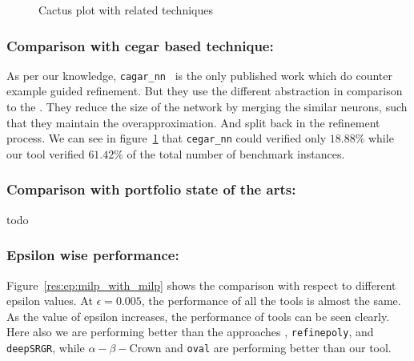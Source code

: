 


\begin{figure}
    \centering
    
    \caption{Cactus plot with related techniques}
    \label{res:milp_with_milp}
\end{figure}

\subsubsection{Comparison with cegar based technique: }
As per our knowledge, \texttt{cagar\_nn}~\cite{elboher2020abstraction} is the only published work which do 
counter example guided refinement. But they use the different abstraction in comparison to the 
\deeppoly{}. They reduce the size of the network by merging the similar neurons, such that 
they maintain the overapproximation. And split back in the refinement process. 
We can see in figure~\ref{res:milp_with_milp} that \texttt{cegar\_nn} could verified only 
$18.88\%$ while our tool verified $61.42\%$ of the total number of benchmark instances. 

\subsubsection{Comparison with portfolio state of the arts: }
todo

\subsubsection{Epsilon wise performance: }
Figure~\ref{res:ep:milp_with_milp} shows the comparison with respect to different epsilon values. 
At $\epsilon=0.005$, the performance of all the tools is almost the same. As the value of epsilon increases, the 
performance of tools can be seen clearly. Here also we are performing better than the approaches \deeppoly{}, 
\texttt{refinepoly}, and \texttt{deepSRGR},
while $\alpha - \beta -$Crown and \texttt{oval} are performing better than our tool. 

